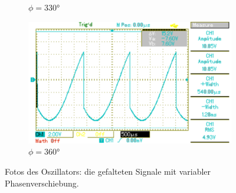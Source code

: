 \begin{figure}[p]
\begin{subfigure}{0.32\textwidth}
		\caption{$\phi=330°$}
	\end{subfigure}
	\begin{subfigure}{0.32\textwidth}
		\includegraphics[width=\textwidth]{Bilder/MAP017.pdf}
		\caption{$\phi=360°$}
	\end{subfigure}
	\caption{Fotos des Oszillators: die gefalteten Signale mit variabler Phasenverschiebung. \cite{gimp}}
	\label{fig:faltung}
\end{figure}
